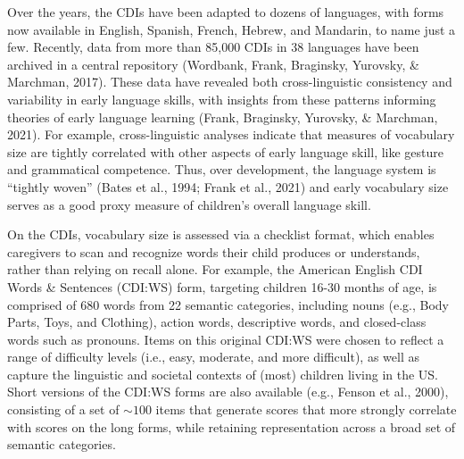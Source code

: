 \documentclass[10pt, letterpaper]{article}
\begin{document}
Over the years, the CDIs have been adapted to dozens of languages, with
forms now available in English, Spanish, French, Hebrew, and Mandarin,
to name just a few. Recently, data from more than 85,000 CDIs in 38
languages have been archived in a central repository (Wordbank, Frank,
Braginsky, Yurovsky, \& Marchman, 2017). These data have revealed both
cross-linguistic consistency and variability in early language skills,
with insights from these patterns informing theories of early language
learning (Frank, Braginsky, Yurovsky, \& Marchman, 2021). For example,
cross-linguistic analyses indicate that measures of vocabulary size are
tightly correlated with other aspects of early language skill, like
gesture and grammatical competence. Thus, over development, the language
system is ``tightly woven'' (Bates et al., 1994; Frank et al., 2021) and
early vocabulary size serves as a good proxy measure of children's
overall language skill.

On the CDIs, vocabulary size is assessed via a checklist format, which
enables caregivers to scan and recognize words their child produces or
understands, rather than relying on recall alone. For example, the
American English CDI Words \& Sentences (CDI:WS) form, targeting
children 16-30 months of age, is comprised of 680 words from 22 semantic
categories, including nouns (e.g., Body Parts, Toys, and Clothing),
action words, descriptive words, and closed-class words such as
pronouns. Items on this original CDI:WS were chosen to reflect a range
of difficulty levels (i.e., easy, moderate, and more difficult), as well
as capture the linguistic and societal contexts of (most) children
living in the US. Short versions of the CDI:WS forms are also available
(e.g., Fenson et al., 2000), consisting of a set of \(\sim100\) items
that generate scores that more strongly correlate with scores on the
long forms, while retaining representation across a broad set of
semantic categories.
\end{document}
